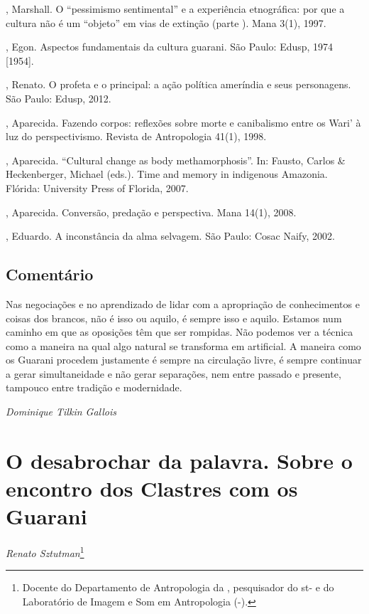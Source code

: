 \begin{Parskip}
, Marshall. O ``pessimismo sentimental'' e a experiência
etnográfica: por que a cultura não é um ``objeto'' em vias de extinção
(parte ). Mana 3(1), 1997.

, Egon. Aspectos fundamentais da cultura guarani. São Paulo:
Edusp, 1974 [1954].

, Renato. O profeta e o principal: a ação política ameríndia e
seus personagens. São Paulo: Edusp, 2012.

, Aparecida. Fazendo corpos: reflexões sobre morte e canibalismo
entre os Wari’ à luz do perspectivismo. Revista de Antropologia 41(1),
1998.

, Aparecida. ``Cultural change as body methamorphosis''. In: Fausto,
Carlos \& Heckenberger, Michael (eds.). Time and memory in indigenous
Amazonia. Flórida: University Press of Florida, 2007.

, Aparecida. Conversão, predação e perspectiva. Mana 14(1), 2008.

  , Eduardo. A inconstância da alma selvagem. São Paulo:
Cosac Naify, 2002.
\end{Parskip}

\section{Comentário}
Nas negociações e no aprendizado de lidar com a apropriação de
conhecimentos e coisas dos brancos, não é isso ou aquilo, é sempre isso
e aquilo. Estamos num caminho em que as oposições têm que ser rompidas.
Não podemos ver a técnica como a maneira na qual algo natural se
transforma em artificial. A maneira como os Guarani procedem justamente
é sempre na circulação livre, é sempre continuar a gerar simultaneidade
e não gerar separações, nem entre passado e presente, tampouco entre
tradição e modernidade.  
\medskip
\begin{flushright}
\emph{Dominique Tilkin Gallois}
\end{flushright}

\chapter{O desabrochar da palavra. Sobre o encontro dos Clastres com os
Guarani}
\begin{flushright}
\emph{Renato Sztutman}\footnote{Docente do Departamento de Antropologia da ,
pesquisador do st- e do Laboratório de Imagem e Som em
Antropologia (-).}
\end{flushright}
\medskip

